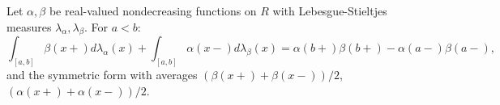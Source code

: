 Let $\alpha,\beta$ be real-valued nondecreasing functions on $R$ with Lebesgue-Stieltjes measures $\lambda_\alpha,\lambda_\beta$. For $a<b$:
$$\int_{[a,b]} \beta(x+) d\lambda_\alpha(x) + \int_{[a,b]} \alpha(x-) d\lambda_\beta(x) = \alpha(b+)\beta(b+) - \alpha(a-)\beta(a-),$$
and the symmetric form with averages $(\beta(x+)+\beta(x-))/2$, $(\alpha(x+)+\alpha(x-))/2$.
